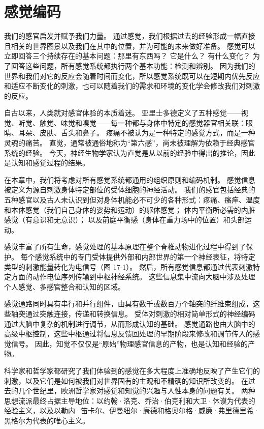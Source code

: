 \chapter{感觉编码} \label{chap:chap17}


我们的感官启发并赋予我们力量。 通过感觉，我们根据过去的经验形成一幅直接且相关的世界图景以及我们在其中的位置，并为可能的未来做好准备。 感觉可以立即回答三个持续存在的基本问题：那里有东西吗？ 它是什么？ 有什么变化？ 为了回答这些问题，所有感觉系统都执行两个基本功能：检测和辨别。 因为我们的世界和我们对它的反应会随着时间而变化，所以感觉系统既可以在短期内优先反应和适应不断变化的刺激，也可以随着我们的需求和环境的变化学会修改我们对刺激的反应。

自古以来，人类就对感官体验的本质着迷。 亚里士多德定义了五种感觉——视觉、听觉、触觉、味觉和嗅觉——每一种都与身体中特定的感觉器官相关联：眼睛、耳朵、皮肤、舌头和鼻子。 疼痛不被认为是一种特定的感觉方式，而是一种灵魂的痛苦。 直觉，通常被通俗地称为“第六感”，尚未被理解为依赖于经典感官系统的经验。 今天，神经生物学家认为直觉是从以前的经验中得出的推论，因此是认知和感觉过程的结果。

在本章中，我们将考虑对所有感觉系统都通用的组织原则和编码机制。 感觉信息被定义为源自刺激身体特定部位的受体细胞的神经活动。 我们的感官包括经典的五种感官以及古人未认识到但对身体机能必不可少的各种形式：疼痛、瘙痒、温度和本体感觉（我们自己身体的姿势和运动）的躯体感觉； 体内平衡所必需的内脏感觉（有意识和无意识）； 以及前庭平衡感（身体在重力场中的位置）和头部运动。

感觉丰富了所有生命，感觉处理的基本原理在整个脊椎动物进化过程中得到了保护。 每个感觉系统中的专门受体提供外部和内部世界的第一个神经表征，将特定类型的刺激能量转化为电信号（图 17-1）。 然后，所有感觉信息都通过代表刺激特定方面的动作电位序列传输到中枢神经系统。 这些信息集中流向大脑中涉及处理个人感觉、多感官整合和认知的区域。

感觉通路同时具有串行和并行组件，由具有数千或数百万个轴突的纤维束组成，这些轴突通过突触连接，传递和转换信息。 受体对刺激的相对简单形式的神经编码通过大脑中复杂的机制进行调节，从而形成认知的基础。 感觉通路也由大脑中的高级中枢控制，这些中枢通过将信息反馈回处理的早期阶段来修改和调节传入的感觉信号。 因此，知觉不仅仅是“原始”物理感官信息的产物，也是认知和经验的产物。

科学家和哲学家都研究了我们体验到的感觉在多大程度上准确地反映了产生它们的刺激，以及它们是如何被我们对世界固有的主观和不精确的知识所改变的。 在过去的几个世纪里，欧洲哲学家对感觉和知觉的兴趣与人性本身的问题有关。 两种思想流派最终占据主导地位：以约翰·洛克、乔治·伯克利和大卫·休谟为代表的经验主义，以及以勒内·笛卡尔、伊曼纽尔·康德和格奥尔格·威廉·弗里德里希·黑格尔为代表的唯心主义。


